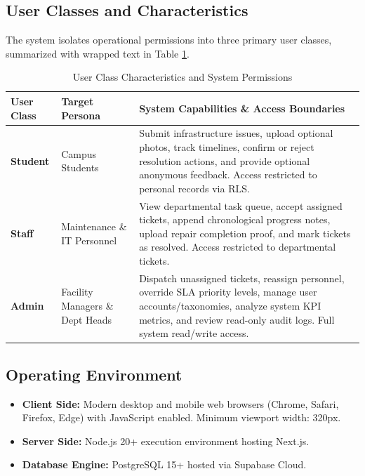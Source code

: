 \documentclass[12pt, a4paper]{article}
\begin{document}
\subsection{User Classes and Characteristics}
The system isolates operational permissions into three primary user classes, summarized with wrapped text in Table \ref{tab:user_classes}.

\begin{table}[H]
    \centering
    \caption{User Class Characteristics and System Permissions}
    \label{tab:user_classes}
    \begin{tabularx}{\textwidth}{p{} p{} X}
        \toprule
        \textbf{User Class} & \textbf{Target Persona} & \textbf{System Capabilities \& Access Boundaries} \\
        \midrule
        \textbf{Student} & Campus Students & Submit infrastructure issues, upload optional photos, track timelines, confirm or reject resolution actions, and provide optional anonymous feedback. Access restricted to personal records via RLS. \\
        \addlinespace
        \textbf{Staff} & Maintenance \& IT Personnel & View departmental task queue, accept assigned tickets, append chronological progress notes, upload repair completion proof, and mark tickets as resolved. Access restricted to departmental tickets. \\
        \addlinespace
        \textbf{Admin} & Facility Managers \& Dept Heads & Dispatch unassigned tickets, reassign personnel, override SLA priority levels, manage user accounts/taxonomies, analyze system KPI metrics, and review read-only audit logs. Full system read/write access. \\
        \bottomrule
    \end{tabularx}
\end{table}

\subsection{Operating Environment}
\begin{itemize}[leftmargin=*]
    \item \textbf{Client Side:} Modern desktop and mobile web browsers (Chrome, Safari, Firefox, Edge) with JavaScript enabled. Minimum viewport width: 320px.
    \item \textbf{Server Side:} Node.js 20+ execution environment hosting Next.js.
    \item \textbf{Database Engine:} PostgreSQL 15+ hosted via Supabase Cloud.
\end{itemize}
\end{document}
